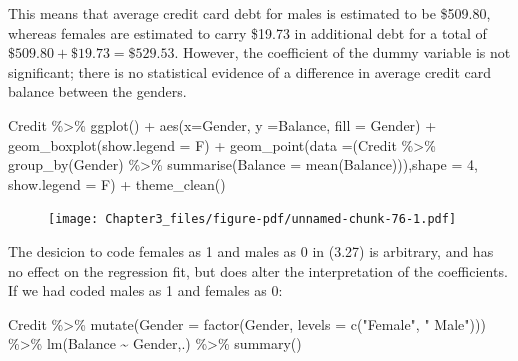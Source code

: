 \documentclass[
  letterpaper,
  DIV=11,
  numbers=noendperiod]{scrreprt}
\newenvironment{Shaded}{\begin{snugshade}}{\end{snugshade}}
\newcommand{\AttributeTok}[1]{\textcolor[rgb]{0.65,0.35,0.00}{#1}}
\newcommand{\DecValTok}[1]{\textcolor[rgb]{0.47,0.16,0.63}{#1}}
\newcommand{\FunctionTok}[1]{\textcolor[rgb]{0.02,0.16,0.49}{#1}}
\newcommand{\NormalTok}[1]{\textcolor[rgb]{0.33,0.33,0.33}{#1}}
\newcommand{\SpecialCharTok}[1]{\textcolor[rgb]{0.00,0.46,0.62}{#1}}
\newcommand{\StringTok}[1]{\textcolor[rgb]{0.00,0.50,0.00}{#1}}
\begin{document}
This means that average credit card debt for males is estimated to be
\$509.80, whereas females are estimated to carry \$19.73 in additional
debt for a total of \(\$509.80 + \$19.73 = \$529.53\). However, the
coefficient of the dummy variable is not significant; there is no
statistical evidence of a difference in average credit card balance
between the genders.

\begin{Shaded}
\begin{Highlighting}[]
\NormalTok{Credit }\SpecialCharTok{\%\textgreater{}\%} 
  \FunctionTok{ggplot}\NormalTok{() }\SpecialCharTok{+} \FunctionTok{aes}\NormalTok{(}\AttributeTok{x=}\NormalTok{Gender, }\AttributeTok{y =}\NormalTok{Balance, }\AttributeTok{fill =}\NormalTok{ Gender) }\SpecialCharTok{+} \FunctionTok{geom\_boxplot}\NormalTok{(}\AttributeTok{show.legend =}\NormalTok{ F) }\SpecialCharTok{+} \FunctionTok{geom\_point}\NormalTok{(}\AttributeTok{data =}\NormalTok{(Credit }\SpecialCharTok{\%\textgreater{}\%} \FunctionTok{group\_by}\NormalTok{(Gender) }\SpecialCharTok{\%\textgreater{}\%} \FunctionTok{summarise}\NormalTok{(}\AttributeTok{Balance =} \FunctionTok{mean}\NormalTok{(Balance))),}\AttributeTok{shape =} \DecValTok{4}\NormalTok{, }\AttributeTok{show.legend =}\NormalTok{ F) }\SpecialCharTok{+} \FunctionTok{theme\_clean}\NormalTok{()}
\end{Highlighting}
\end{Shaded}

\begin{figure}[H]

{\centering \texttt{[image: Chapter3\_files/figure-pdf/unnamed-chunk-76-1.pdf]}

}

\end{figure}

The desicion to code females as 1 and males as 0 in (3.27) is arbitrary,
and has no effect on the regression fit, but does alter the
interpretation of the coefficients. If we had coded males as 1 and
females as 0:

\begin{Shaded}
\begin{Highlighting}[]
\NormalTok{Credit }\SpecialCharTok{\%\textgreater{}\%} 
  \FunctionTok{mutate}\NormalTok{(}\AttributeTok{Gender =} \FunctionTok{factor}\NormalTok{(Gender, }\AttributeTok{levels =} \FunctionTok{c}\NormalTok{(}\StringTok{"Female"}\NormalTok{, }\StringTok{" Male"}\NormalTok{))) }\SpecialCharTok{\%\textgreater{}\%} 
  \FunctionTok{lm}\NormalTok{(Balance }\SpecialCharTok{\textasciitilde{}}\NormalTok{ Gender,.) }\SpecialCharTok{\%\textgreater{}\%} 
  \FunctionTok{summary}\NormalTok{()}
\end{Highlighting}
\end{Shaded}
\end{document}
